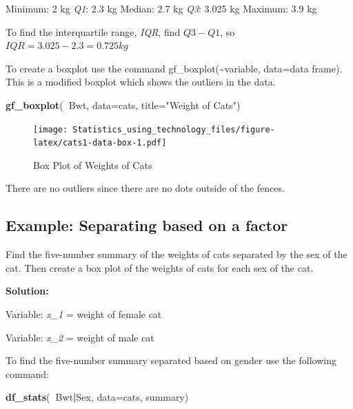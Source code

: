 \documentclass[]{book}
\newenvironment{Shaded}{\begin{snugshade}}{\end{snugshade}}
\newcommand{\DataTypeTok}[1]{\textcolor[rgb]{0.13,0.29,0.53}{#1}}
\newcommand{\KeywordTok}[1]{\textcolor[rgb]{0.13,0.29,0.53}{\textbf{#1}}}
\newcommand{\NormalTok}[1]{#1}
\newcommand{\OperatorTok}[1]{\textcolor[rgb]{0.81,0.36,0.00}{\textbf{#1}}}
\newcommand{\StringTok}[1]{\textcolor[rgb]{0.31,0.60,0.02}{#1}}
\begin{document}
Minimum: 2 kg
\emph{Q1}: 2.3 kg
Median: 2.7 kg
\emph{Q3}: 3.025 kg
Maximum: 3.9 kg

To find the interquartile range, \emph{IQR}, find \(Q3-Q1\), so \(IQR=3.025-2.3=0.725 kg\)

To create a boxplot use the command gf\_boxplot(\textasciitilde{}variable, data=data frame). This is a modified boxplot which shows the outliers in the data.



\begin{Shaded}
\begin{Highlighting}[]
\KeywordTok{gf_boxplot}\NormalTok{(}\OperatorTok{~}\NormalTok{Bwt, }\DataTypeTok{data=}\NormalTok{cats, }\DataTypeTok{title=}\StringTok{"Weight of Cats"}\NormalTok{)}
\end{Highlighting}
\end{Shaded}

\begin{figure}
\centering
\texttt{[image: Statistics\_using\_technology\_files/figure-latex/cats1-data-box-1.pdf]}
\caption{\label{fig:cats1-data-box}Box Plot of Weights of Cats}
\end{figure}

There are no outliers since there are no dots outside of the fences.

\hypertarget{example-separating-based-on-a-factor}{%
\subsection{Example: Separating based on a factor}\label{example-separating-based-on-a-factor}}

Find the five-number summary of the weights of cats separated by the sex of the cat. Then create a box plot of the weights of cats for each sex of the cat.

\textbf{Solution:}

Variable: \emph{x\_1} = weight of female cat

Variable: \emph{x\_2} = weight of male cat

To find the five-number summary separated based on gender use the following command:

\begin{Shaded}
\begin{Highlighting}[]
\KeywordTok{df_stats}\NormalTok{(}\OperatorTok{~}\NormalTok{Bwt}\OperatorTok{|}\NormalTok{Sex, }\DataTypeTok{data=}\NormalTok{cats, summary)}
\end{Highlighting}
\end{Shaded}
\end{document}
